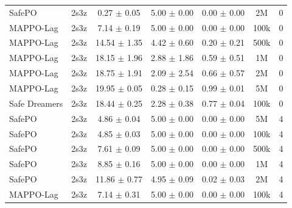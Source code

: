 \documentclass{article}
\begin{document}
\begin{longtable}{lcccccc}
SafePO & 2s3z & \textcolor{green!60!black}{0.27 $\pm$ 0.05} & \textcolor{green!60!black}{5.00 $\pm$ 0.00} & \textcolor{green!60!black}{0.00 $\pm$ 0.00} & 2M & 0 \\
MAPPO-Lag & 2s3z & \textcolor{green!60!black}{7.14 $\pm$ 0.19} & \textcolor{green!60!black}{5.00 $\pm$ 0.00} & \textcolor{green!60!black}{0.00 $\pm$ 0.00} & 100k & 0 \\
MAPPO-Lag & 2s3z & \textcolor{green!60!black}{14.54 $\pm$ 1.35} & \textcolor{green!60!black}{4.42 $\pm$ 0.60} & \textcolor{green!60!black}{0.20 $\pm$ 0.21} & 500k & 0 \\
MAPPO-Lag & 2s3z & \textcolor{green!60!black}{18.15 $\pm$ 1.96} & \textcolor{green!60!black}{2.88 $\pm$ 1.86} & \textcolor{green!60!black}{0.59 $\pm$ 0.51} & 1M & 0 \\
MAPPO-Lag & 2s3z & \textcolor{red!70!black}{18.75 $\pm$ 1.91} & \textcolor{red!70!black}{2.09 $\pm$ 2.54} & \textcolor{green!60!black}{0.66 $\pm$ 0.57} & 2M & 0 \\
MAPPO-Lag & 2s3z & \textcolor{red!70!black}{19.95 $\pm$ 0.05} & \textcolor{red!70!black}{0.28 $\pm$ 0.15} & \textcolor{red!70!black}{0.99 $\pm$ 0.01} & 5M & 0 \\
Safe Dreamers & 2s3z & 18.44 $\pm$ 0.25 & 2.28 $\pm$ 0.38 & 0.77 $\pm$ 0.04 & 100k & 0 \\
\midrule
SafePO & 2s3z & \textcolor{green!60!black}{4.86 $\pm$ 0.04} & \textcolor{green!60!black}{5.00 $\pm$ 0.00} & \textcolor{green!60!black}{0.00 $\pm$ 0.00} & 5M & 4 \\
SafePO & 2s3z & \textcolor{green!60!black}{4.85 $\pm$ 0.03} & \textcolor{green!60!black}{5.00 $\pm$ 0.00} & \textcolor{green!60!black}{0.00 $\pm$ 0.00} & 100k & 4 \\
SafePO & 2s3z & \textcolor{green!60!black}{7.61 $\pm$ 0.09} & \textcolor{green!60!black}{5.00 $\pm$ 0.00} & \textcolor{green!60!black}{0.00 $\pm$ 0.00} & 500k & 4 \\
SafePO & 2s3z & \textcolor{green!60!black}{8.85 $\pm$ 0.16} & \textcolor{green!60!black}{5.00 $\pm$ 0.00} & \textcolor{green!60!black}{0.00 $\pm$ 0.00} & 1M & 4 \\
SafePO & 2s3z & \textcolor{green!60!black}{11.86 $\pm$ 0.77} & \textcolor{green!60!black}{4.95 $\pm$ 0.09} & \textcolor{green!60!black}{0.02 $\pm$ 0.03} & 2M & 4 \\
MAPPO-Lag & 2s3z & \textcolor{green!60!black}{7.14 $\pm$ 0.31} & \textcolor{green!60!black}{5.00 $\pm$ 0.00} & \textcolor{green!60!black}{0.00 $\pm$ 0.00} & 100k & 4 \\

\end{longtable}
\end{document}
